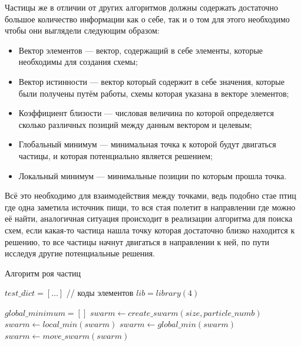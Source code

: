 \documentclass[14pt]{extarticle} %
\begin{document}
Частицы же в отличии от других алгоритмов должны содержать достаточно большое количество информации как о себе, так и о том для этого необходимо чтобы они выглядели следующим образом:
\begin{itemize}
	\item Вектор элементов --- вектор, содержащий в себе элементы, которые необходимы для создания схемы;
	\item Вектор истинности --- вектор который содержит в себе значения, которые были получены путём работы, схемы которая указана в векторе элементов;
	\item Коэффициент близости --- числовая величина по которой определяется сколько различных позиций между данным вектором и целевым;
	\item Глобальный минимум --- минимальная точка к которой будут двигаться частицы, и которая потенциально является решением;
	\item Локальный минимум --- минимальные позиции по которым прошла точка.
\end{itemize}
Всё это необходимо для взаимодействия между точками, ведь подобно стае птиц где одна заметила источник пищи, то вся стая полетит в направлении где можно её найти, аналогичная ситуация происходит в реализации алгоритма для поиска схем, если какая-то частица нашла точку которая достаточно близко находится к решению, то все частицы начнут двигаться в направлении к ней, по пути исследуя другие потенциальные решения.


  \begin{algorithm}
  	
	\caption{Алгоритм роя частиц}\label{alg:Examples_swar}
	\begin{algorithmic}[1]
		
		\State $test\_dict=[\ldots]$ // коды элементов
		\State $lib=library(4)$
		
		\State
		\State $global\_minimum=[]$
		\State $swarm\leftarrow create\_swarm(size,particle\_numb)$
		\State{}
		\State{}
		\State $swarm\leftarrow local\_min(swarm)$
		\State $swarm\leftarrow global\_min(swarm)$
		\State $swarm\leftarrow move\_swarm(swarm)$
		
		
		
		\EndProcedure
		
		
	\end{algorithmic}
\end{algorithm}
\end{document}
